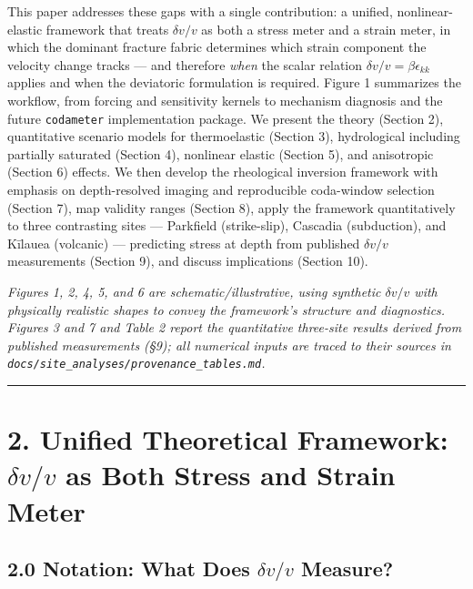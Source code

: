 \documentclass[12pt]{article}
\begin{document}
This paper addresses these gaps with a single contribution: a unified,
nonlinear-elastic framework that treats \(\delta v/v\) as both a stress
meter and a strain meter, in which the dominant fracture fabric
determines which strain component the velocity change tracks --- and
therefore \emph{when} the scalar relation
\(\delta v/v = \beta\epsilon_{kk}\) applies and when the deviatoric
formulation is required. Figure 1 summarizes the workflow, from forcing
and sensitivity kernels to mechanism diagnosis and the future
\texttt{codameter} implementation package. We present the theory
(Section 2), quantitative scenario models for thermoelastic (Section 3),
hydrological including partially saturated (Section 4), nonlinear
elastic (Section 5), and anisotropic (Section 6) effects. We then
develop the rheological inversion framework with emphasis on
depth-resolved imaging and reproducible coda-window selection (Section
7), map validity ranges (Section 8), apply the framework quantitatively
to three contrasting sites --- Parkfield (strike-slip), Cascadia
(subduction), and Kīlauea (volcanic) --- predicting stress at depth from
published \(\delta v/v\) measurements (Section 9), and discuss
implications (Section 10).

\emph{Figures 1, 2, 4, 5, and 6 are schematic/illustrative, using
synthetic \(\delta v/v\) with physically realistic shapes to convey the
framework's structure and diagnostics. Figures 3 and 7 and Table 2
report the quantitative three-site results derived from published
measurements (§9); all numerical inputs are traced to their sources in
\texttt{docs/site\_analyses/provenance\_tables.md}.}

\begin{center}\rule{0.5\linewidth}{0.5pt}\end{center}

\section{\texorpdfstring{2. Unified Theoretical Framework:
\(\delta v/v\) as Both Stress and Strain
Meter}{2. Unified Theoretical Framework: \textbackslash delta v/v as Both Stress and Strain Meter}}\label{unified-theoretical-framework-delta-vv-as-both-stress-and-strain-meter}

\subsection{\texorpdfstring{2.0 Notation: What Does \(\delta v/v\)
Measure?}{2.0 Notation: What Does \textbackslash delta v/v Measure?}}\label{notation-what-does-delta-vv-measure}
\end{document}
